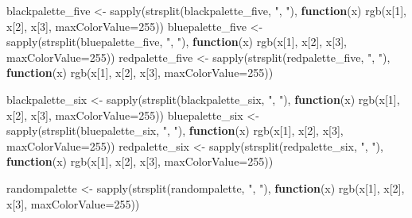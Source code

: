 \documentclass[
]{book}
\newenvironment{Shaded}{\begin{snugshade}}{\end{snugshade}}
\newcommand{\AttributeTok}[1]{\textcolor[rgb]{0.77,0.63,0.00}{#1}}
\newcommand{\ControlFlowTok}[1]{\textcolor[rgb]{0.13,0.29,0.53}{\textbf{#1}}}
\newcommand{\DecValTok}[1]{\textcolor[rgb]{0.00,0.00,0.81}{#1}}
\newcommand{\FunctionTok}[1]{\textcolor[rgb]{0.00,0.00,0.00}{#1}}
\newcommand{\NormalTok}[1]{#1}
\newcommand{\OtherTok}[1]{\textcolor[rgb]{0.56,0.35,0.01}{#1}}
\newcommand{\StringTok}[1]{\textcolor[rgb]{0.31,0.60,0.02}{#1}}
\begin{document}
\begin{Shaded}
\begin{Highlighting}[]
\NormalTok{blackpalette\_five }\OtherTok{\textless{}{-}} \FunctionTok{sapply}\NormalTok{(}\FunctionTok{strsplit}\NormalTok{(blackpalette\_five, }\StringTok{", "}\NormalTok{), }\ControlFlowTok{function}\NormalTok{(x)}
    \FunctionTok{rgb}\NormalTok{(x[}\DecValTok{1}\NormalTok{], x[}\DecValTok{2}\NormalTok{], x[}\DecValTok{3}\NormalTok{], }\AttributeTok{maxColorValue=}\DecValTok{255}\NormalTok{))}
\NormalTok{bluepalette\_five }\OtherTok{\textless{}{-}} \FunctionTok{sapply}\NormalTok{(}\FunctionTok{strsplit}\NormalTok{(bluepalette\_five, }\StringTok{", "}\NormalTok{), }\ControlFlowTok{function}\NormalTok{(x)}
    \FunctionTok{rgb}\NormalTok{(x[}\DecValTok{1}\NormalTok{], x[}\DecValTok{2}\NormalTok{], x[}\DecValTok{3}\NormalTok{], }\AttributeTok{maxColorValue=}\DecValTok{255}\NormalTok{))}
\NormalTok{redpalette\_five }\OtherTok{\textless{}{-}} \FunctionTok{sapply}\NormalTok{(}\FunctionTok{strsplit}\NormalTok{(redpalette\_five, }\StringTok{", "}\NormalTok{), }\ControlFlowTok{function}\NormalTok{(x)}
    \FunctionTok{rgb}\NormalTok{(x[}\DecValTok{1}\NormalTok{], x[}\DecValTok{2}\NormalTok{], x[}\DecValTok{3}\NormalTok{], }\AttributeTok{maxColorValue=}\DecValTok{255}\NormalTok{))}

\NormalTok{blackpalette\_six }\OtherTok{\textless{}{-}} \FunctionTok{sapply}\NormalTok{(}\FunctionTok{strsplit}\NormalTok{(blackpalette\_six, }\StringTok{", "}\NormalTok{), }\ControlFlowTok{function}\NormalTok{(x)}
    \FunctionTok{rgb}\NormalTok{(x[}\DecValTok{1}\NormalTok{], x[}\DecValTok{2}\NormalTok{], x[}\DecValTok{3}\NormalTok{], }\AttributeTok{maxColorValue=}\DecValTok{255}\NormalTok{))}
\NormalTok{bluepalette\_six }\OtherTok{\textless{}{-}} \FunctionTok{sapply}\NormalTok{(}\FunctionTok{strsplit}\NormalTok{(bluepalette\_six, }\StringTok{", "}\NormalTok{), }\ControlFlowTok{function}\NormalTok{(x)}
    \FunctionTok{rgb}\NormalTok{(x[}\DecValTok{1}\NormalTok{], x[}\DecValTok{2}\NormalTok{], x[}\DecValTok{3}\NormalTok{], }\AttributeTok{maxColorValue=}\DecValTok{255}\NormalTok{))}
\NormalTok{redpalette\_six }\OtherTok{\textless{}{-}} \FunctionTok{sapply}\NormalTok{(}\FunctionTok{strsplit}\NormalTok{(redpalette\_six, }\StringTok{", "}\NormalTok{), }\ControlFlowTok{function}\NormalTok{(x)}
    \FunctionTok{rgb}\NormalTok{(x[}\DecValTok{1}\NormalTok{], x[}\DecValTok{2}\NormalTok{], x[}\DecValTok{3}\NormalTok{], }\AttributeTok{maxColorValue=}\DecValTok{255}\NormalTok{))}

\NormalTok{randompalette }\OtherTok{\textless{}{-}} \FunctionTok{sapply}\NormalTok{(}\FunctionTok{strsplit}\NormalTok{(randompalette, }\StringTok{", "}\NormalTok{), }\ControlFlowTok{function}\NormalTok{(x)}
    \FunctionTok{rgb}\NormalTok{(x[}\DecValTok{1}\NormalTok{], x[}\DecValTok{2}\NormalTok{], x[}\DecValTok{3}\NormalTok{], }\AttributeTok{maxColorValue=}\DecValTok{255}\NormalTok{))}



\end{Highlighting}
\end{Shaded}
\end{document}
